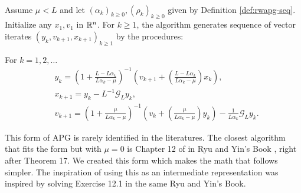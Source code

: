 \documentclass[12pt]{article}
\begin{document}
        \begin{definition}\label{def:r-wapg-intermediate}\;\\
            Assume $\mu < L$ and let $(\alpha_k)_{k \ge 0}, (\rho_k)_{k \ge 0}$ given by Definition \ref{def:rwapg-seq}. 
            Initialize any $x_1, v_1$ in $\mathbb R^n$. 
            For $k \ge 1$, the algorithm generates sequence of vector iterates $(y_{k}, v_{k + 1}, x_{k + 1})_{k \ge 1}$ by the procedures: 
            \begin{tcolorbox}
                For $k = 1, 2, \ldots$
                \begin{align*} 
                    & y_{k} = 
                    \left(
                        1 + \frac{L - L\alpha_{k}}{L\alpha_{k} - \mu}
                    \right)^{-1}
                    \left(
                        v_{k + 1} + 
                        \left(\frac{L - L\alpha_{k}}{L\alpha_{k} - \mu} \right) x_{k}
                    \right), 
                    \\
                    & x_{k + 1} = 
                    y_k - L^{-1} \mathcal G_L y_k, 
                    \\
                    & v_{k + 1} = 
                    \left(
                        1 + \frac{\mu}{L \alpha_k - \mu}
                    \right)^{-1}
                    \left(
                        v_k + 
                        \left(\frac{\mu}{L \alpha_k - \mu}\right) y_k
                    \right) - \frac{1}{L\alpha_{k}}\mathcal G_L y_k. 
                \end{align*}
            \end{tcolorbox}
        \end{definition}
        \begin{remark}
            This form of APG is rarely identified in the literatures. 
            The closest algorithm that fits the form but with $\mu = 0$ is Chapter 12 of in Ryu and Yin's Book \cite{ryu_large-scale_2022}, right after Theorem 17. 
            We created this form which makes the math that follows simpler. 
            The inspiration of using this as an intermediate representation was inspired by solving Exercise 12.1 in the same Ryu and Yin's Book. 
        \end{remark}
\end{document}

